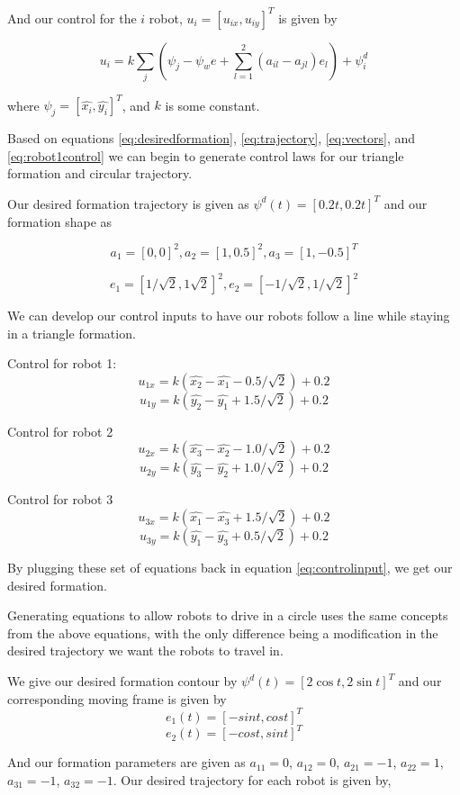 \documentclass[12pt]{article}
\begin{document}
And our control for the $i$ robot, $u_i = [u_{ix}, u_{iy}]^T$ is given by

\begin{equation}
	u_i = k \sum\limits_{j}\left(\psi_j - \psi_we + \sum\limits_{l = 1}^{2}(a_{il} - a_{jl})e_l\right)  + \psi_i^d \label{eq:robot1control}
\end{equation}

where $\psi_j = [\hat{x_i}, \hat{y_i}]^T$, and $k$ is some constant.


Based on equations \ref{eq:desiredformation}, \ref{eq:trajectory}, \ref{eq:vectors}, and \ref{eq:robot1control} we can begin to generate control laws for our triangle formation and circular trajectory.

Our desired formation trajectory is given as $\psi^d(t) =[0.2t,0.2t]^T$ and our formation shape as

\[ a_1 = [0,0]^2 , a_2 = [1,0.5]^2, a_3 = [1, -0.5]^T \]

\[ e_1 = [1/\sqrt{2}, 1\sqrt{2}]^2, e_2 = [-1/\sqrt{2}, 1/\sqrt{2}]^2 \]

We can develop our control inputs to have our robots follow a line while staying in a triangle formation.

Control for robot 1:
\[ u_{1x} = k(\hat{x_2} - \hat{x_1} - 0.5/\sqrt{2}) + 0.2 \]
\[ u_{1y} = k(\hat{y_2} - \hat{y_1} + 1.5/\sqrt{2}) + 0.2 \]
 
Control for robot 2
\[ u_{2x} = k(\hat{x_3} - \hat{x_2} - 1.0/\sqrt{2}) + 0.2 \]
\[ u_{2y} = k(\hat{y_3} - \hat{y_2} + 1.0/\sqrt{2}) + 0.2 \]
 
Control for robot 3
\[ u_{3x} = k(\hat{x_1} - \hat{x_3} + 1.5/\sqrt{2}) + 0.2 \]
\[ u_{3y} = k(\hat{y_1} - \hat{y_3} + 0.5/\sqrt{2}) + 0.2 \]

By plugging these set of equations back in equation \ref{eq:controlinput}, we get our desired formation.


Generating equations to allow robots to drive in a circle uses the same concepts from the above equations, with the only difference being a modification in the desired trajectory we want the robots to travel in.

We give our desired formation contour by $\psi^d(t) = [2\cos t, 2\sin t]^T$ and our corresponding moving frame is given by
\[e_1(t) = [-sin t, cos t]^T\]
\[e_2(t) = [-cos t, sin t]^T\]

And our formation parameters are given as $a_{11} = 0$, $a_{12} = 0$, $a_{21} = -1$, $a_{22} = 1$, $a_{31} = -1$, $a_{32} = -1$. Our desired trajectory for each robot is given by,
\end{document}
